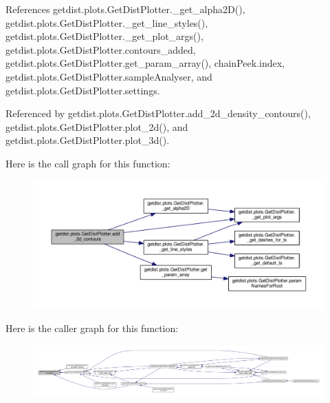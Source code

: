 References getdist.\+plots.\+Get\+Dist\+Plotter.\+\_\+get\+\_\+alpha2\+D(), getdist.\+plots.\+Get\+Dist\+Plotter.\+\_\+get\+\_\+line\+\_\+styles(), getdist.\+plots.\+Get\+Dist\+Plotter.\+\_\+get\+\_\+plot\+\_\+args(), getdist.\+plots.\+Get\+Dist\+Plotter.\+contours\+\_\+added, getdist.\+plots.\+Get\+Dist\+Plotter.\+get\+\_\+param\+\_\+array(), chain\+Peek.\+index, getdist.\+plots.\+Get\+Dist\+Plotter.\+sample\+Analyser, and getdist.\+plots.\+Get\+Dist\+Plotter.\+settings.



Referenced by getdist.\+plots.\+Get\+Dist\+Plotter.\+add\+\_\+2d\+\_\+density\+\_\+contours(), getdist.\+plots.\+Get\+Dist\+Plotter.\+plot\+\_\+2d(), and getdist.\+plots.\+Get\+Dist\+Plotter.\+plot\+\_\+3d().

Here is the call graph for this function\+:
\nopagebreak
\begin{figure}[H]
\begin{center}
\leavevmode
\includegraphics[width=350pt]{classgetdist_1_1plots_1_1GetDistPlotter_a0a51d5af908d2dc06b0e26d5bad61e89_cgraph}
\end{center}
\end{figure}
Here is the caller graph for this function\+:
\nopagebreak
\begin{figure}[H]
\begin{center}
\leavevmode
\includegraphics[width=350pt]{classgetdist_1_1plots_1_1GetDistPlotter_a0a51d5af908d2dc06b0e26d5bad61e89_icgraph}
\end{center}
\end{figure}
\mbox{\label{classgetdist_1_1plots_1_1GetDistPlotter_aa778142d973eb5a21663b564743b77d6}} 
